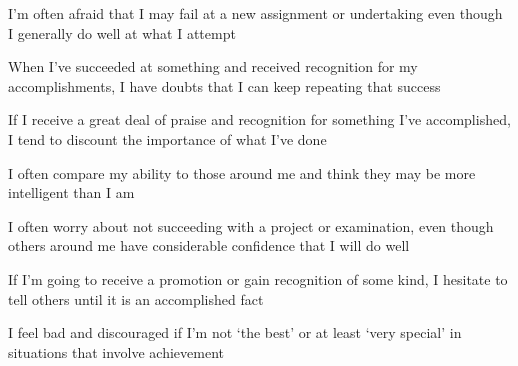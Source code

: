\documentclass[aspectratio=169]{beamer}
\begin{document}
\begin{frame}
  \begin{center}
    \Huge     I’m  often  afraid  that  I  may  fail  at  a  new  assignment  or  undertaking  even  though  I  generally  do  well  at  what  I
  attempt
\end{center}
\end{frame}

\begin{frame}
  \begin{center}
    \Huge   When  I’ve  succeeded  at  something  and  received  recognition  for  my  accomplishments,  I  have  doubts  that I can keep repeating that success
\end{center}
\end{frame}

\begin{frame}
  \begin{center}
    \Huge     If  I  receive  a  great  deal  of  praise  and  recognition  for  something  I’ve  accomplished,  I  tend  to  discount  the  importance
  of  what  I’ve  done
\end{center}
\end{frame}

\begin{frame}
  \begin{center}
    \Huge     I often compare my ability to those around me and think they may be more intelligent than I am
  \end{center}
\end{frame}

\begin{frame}
  \begin{center}
    \Huge      I often worry about not succeeding with a project or examination, even though others around me have considerable
confidence that I will do well
\end{center}
\end{frame}

\begin{frame}
  \begin{center}
    \Huge       If  I’m  going  to  receive  a  promotion  or  gain  recognition  of  some  kind,  I  hesitate  to  tell  others  until  it  is  an
  accomplished fact
\end{center}
\end{frame}

\begin{frame}
  \begin{center}
    \Huge  I  feel  bad  and  discouraged  if  I’m  not  `the  best'  or  at  least  `very  special'  in  situations  that  involve  achievement
\end{center}
\end{frame}
\end{document}
